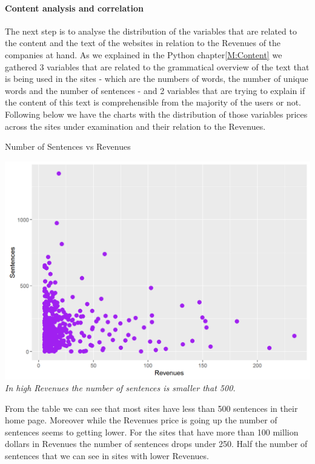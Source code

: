 \documentclass{article}
\begin{document}
\paragraph{Content analysis and correlation}
The next step is to analyse the distribution of the variables that are related to the content and the text of the websites in relation to the Revenues of the companies at hand. As we explained in the Python chapter\ref{M:Content} we gathered 3 variables that are related to the grammatical overview of the text that is being used in the sites - which are the numbers of words, the number of unique words and the number of sentences - and 2 variables that are trying to explain if the content of this text is comprehensible from the majority of the users or not. Following below we have the charts with the distribution of those variables prices across the sites under examination and their relation to the Revenues.
\begin{table}[H]
\centering
\caption{Number of Sentences vs Revenues}
\begin{center}
\includegraphics[scale=0.5]{../R/photos/33_sent_rev.png}  \\
\textit{In high Revenues the number of sentences is smaller that 500.}
\end{center}
\end{table}
From the table we can see that most sites have less than 500 sentences in their home page. Moreover while the Revenues price is going up the number of sentences seems to getting lower. For the sites that have more than 100 million dollars in Revenues the number of sentences drops under 250. Half the number of sentences that we can see in sites with lower Revenues.
\end{document}
